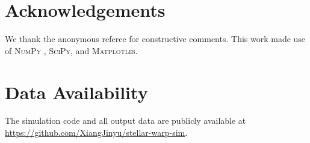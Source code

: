 \documentclass[fleqn,usenatbib]{mnras}
\begin{document}










\section*{Acknowledgements}
We thank the anonymous referee for constructive comments.
This work made use of \textsc{NumPy} \citep[]{numpy2020}, \textsc{SciPy}, and \textsc{Matplotlib}.

\section*{Data Availability}
The simulation code and all output data are publicly available at \url{https://github.com/XiangJinyu/stellar-warp-sim}.




\bsp
\label{lastpage}
\end{document}
